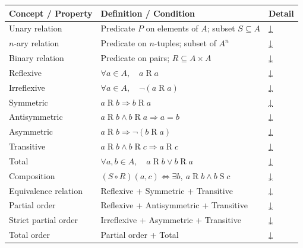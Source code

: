 \begin{tcolorbox}[colback=gray!6, colframe=gray!40, arc=2pt,
  left=6pt, right=6pt, top=4pt, bottom=4pt,
  title={\small\textbf{Relations — Quick Reference}},
  fonttitle=\small\bfseries]
\small
\begin{tabular}{l l l}
\toprule
\textbf{Concept / Property} & \textbf{Definition / Condition} & \textbf{Detail} \\
\midrule
Unary relation     & Predicate $P$ on elements of $A$; subset $S \subseteq A$            & \hyperref[def:unary-relation]{↓} \\
$n$-ary relation   & Predicate on $n$-tuples; subset of $A^n$                            & \hyperref[def:nary-relation]{↓} \\
Binary relation    & Predicate on pairs; $R \subseteq A \times A$                        & \hyperref[def:binary-relation]{↓} \\
\midrule
Reflexive      & $\forall a \in A,\quad a \mathrel{R} a$                                  & \hyperref[def:rel-reflexive]{↓} \\
Irreflexive    & $\forall a \in A,\quad \lnot(a \mathrel{R} a)$                           & \hyperref[def:rel-irreflexive]{↓} \\
Symmetric      & $a \mathrel{R} b \Rightarrow b \mathrel{R} a$                             & \hyperref[def:rel-symmetric]{↓} \\
Antisymmetric  & $a \mathrel{R} b \land b \mathrel{R} a \Rightarrow a = b$                 & \hyperref[def:rel-antisymmetric]{↓} \\
Asymmetric     & $a \mathrel{R} b \Rightarrow \lnot(b \mathrel{R} a)$                      & \hyperref[def:rel-asymmetric]{↓} \\
Transitive     & $a \mathrel{R} b \land b \mathrel{R} c \Rightarrow a \mathrel{R} c$       & \hyperref[def:rel-transitive]{↓} \\
Total          & $\forall a,b \in A,\quad a \mathrel{R} b \lor b \mathrel{R} a$            & \hyperref[def:rel-total]{↓} \\
\midrule
Composition    & $(S \circ R)(a,c) \iff \exists b,\ a\mathrel{R}b \land b\mathrel{S}c$    & \hyperref[def:rel-composition]{↓} \\
\midrule
Equivalence relation & Reflexive + Symmetric + Transitive                                & \hyperref[def:equiv-relation]{↓} \\
Partial order        & Reflexive + Antisymmetric + Transitive                            & \hyperref[def:partial-order]{↓} \\
Strict partial order & Irreflexive + Asymmetric + Transitive                             & \hyperref[def:strict-partial-order]{↓} \\
Total order          & Partial order + Total                                             & \hyperref[def:total-order]{↓} \\
\bottomrule
\end{tabular}
\end{tcolorbox}

